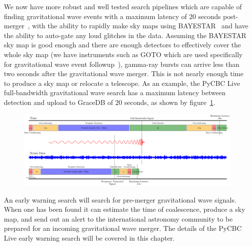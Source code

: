 We now have more robust and well tested search pipelines which are capable of finding gravitational wave events with a maximum latency of $20$ seconds post-merger~\cite{PyCBC_Live:2018}, with the ability to rapidly make sky maps using BAYESTAR~\cite{BAYESTAR:2016} and have the ability to auto-gate any loud glitches in the data. Assuming the BAYESTAR sky map is good enough and there are enough detectors to effectively cover the whole sky map (we have instruments such as GOTO which are used specifically for gravitational wave event followup~\cite{GOTO:2020}), gamma-ray bursts can arrive less than two seconds after the gravitational wave merger. This is not nearly enough time to produce a sky map or relocate a telescope. As an example, the PyCBC Live full-bandwidth gravitational wave search has a maximum latency between detection and upload to GraceDB of $20$ seconds, as shown by figure~\ref{6:fig:latency_plot}.
%
\begin{figure}
    \centering
    \includegraphics[width=\textwidth]{images/6_earlywarning/gw170817/latency_plot.pdf}
    \caption{}
    \label{6:fig:latency_plot}
\end{figure}
%
An early warning search will search for pre-merger gravitational wave signals. When one has been found it can estimate the time of coalescence, produce a sky map, and send out an alert to the international astronomy community to be prepared for an incoming gravitational wave merger. The details of the PyCBC Live early warning search will be covered in this chapter.

